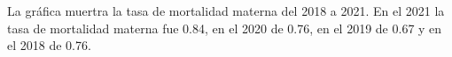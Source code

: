 La gráfica muertra la tasa de mortalidad materna del 2018 a 2021. En el 2021 la tasa de mortalidad materna fue 0.84, en el 2020 de 0.76, en el 2019 de 0.67 y en el 2018 de 0.76. 